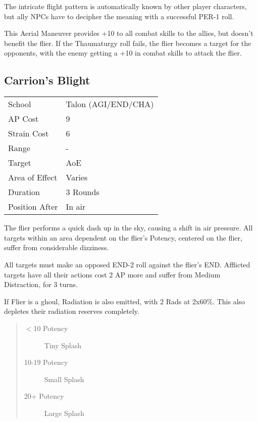 \documentclass[11pt,a4paper,twocolumn]{book}
\begin{document}
The intricate flight pattern is automatically known by other player characters, but ally NPCs have to decipher the meaning with a successful PER-1 roll.

This Aerial Maneuver provides +10 to all combat skills to the allies, but doesn't benefit the flier. If the Thaumaturgy roll fails, the flier becomes a target for the opponents, with the enemy getting a +10 in combat skills to attack the flier.


\subsection*{Carrion's Blight}
{
	\begin{tabu} to 75mm{| X[l,4] | X[l,7] |}
		\hline
		School 			& Talon (AGI/END/CHA)			\\
		AP Cost	      	& 9 				\\
		Strain Cost     & 6 				\\
		Range     		& - 				\\
		Target      	& AoE 				\\
		Area of Effect  & Varies 	 	\\
		Duration     	& 3 Rounds	 	\\
		Position After  & In air 			\\ \hline
	\end{tabu}
}

\medskip

The flier performs a quick dash up in the sky, causing a shift in air pressure. All targets within an area dependent on the flier's Potency, centered on the flier, suffer from considerable dizziness.

All targets must make an opposed END-2 roll against the flier's END. Afflicted targets have all their actions cost 2 AP more and suffer from Medium Distraction, for 3 turns.

If Flier is a ghoul, Radiation is also emitted, with 2 Rads at 2x60\%. This also depletes their radiation reserves completely.

\begin{quote}
	\begin{description}
		\item[$<$10 Potency] 	Tiny Splash
		\item[10-19 Potency] 	Small Splash
		\item[20+ Potency] 	Large Splash
	\end{description}
\end{quote}
\end{document}
